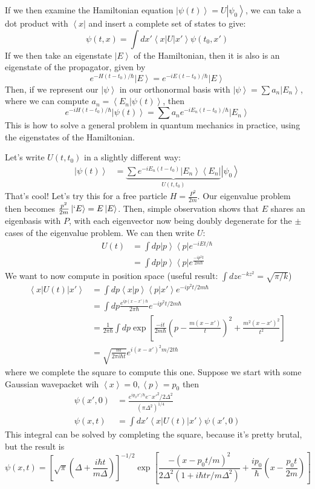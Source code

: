 \documentclass[10pt]{report}
\newcommand{\bra}[1]{\left<#1\right|}
\newcommand{\ket}[1]{\left|#1\right>}
\newcommand{\dotp}[2]{\left<#1\left.\right|#2\right>}
\newcommand{\expvalue}[1]{\left<#1\right>}
\begin{document}
If we then examine the Hamiltonian equation $\ket{\psi(t)} = U\ket{\psi_0}$, we can take a dot product with $\bra{x}$ and insert a complete set of states to give:
$$\psi(t,x) = \int dx' \bra{x}U\ket{x'}\psi(t_0,x')$$
If we then take an eigenstate $\ket{E}$ of the Hamiltonian, then it is also is an eigenstate of the propagator, given by
$$e^{-H(t-t_0)/\hbar}\ket{E} = e^{-iE(t-t_0)/\hbar}\ket{E}$$
Then, if we represent our $\ket{\psi}$ in our orthonormal basis with $\ket{\psi} = \sum a_n \ket{E_n}$, where we can compute $a_n = \dotp{E_n}{\psi(t)}$, then
$$e^{-iH(t-t_0)/\hbar}\ket{\psi(t)} = \sum a_n e^{-iE_n(t-t_0)/\hbar}\ket{E_n}$$
This is how to solve a general problem in quantum mechanics in practice, using the eigenstates of the Hamiltonian.

Let's write $U(t,t_0)$ in a slightly different way:
\begin{align}
	\ket{\psi(t)} &= \underbrace{\sum e^{-iE_n(t-t_0)}\ket{E_n}\bra{E_n}}_{U(t,t_0)}\ket{\psi_0}
\end{align}
That's cool! Let's try this for a free particle $H = \frac{P^2}{2m}$. Our eigenvalue problem then becomes $\frac{p^2}{2m}\ket{`E}=E\ket{E}$. Then, simple observation shows that $E$ shares an eigenbasis with $P$, with each eigenvector now being doubly degenerate for the $\pm$ cases of the eigenvalue problem. We can then write $U$:
\begin{align}
	U(t) &= \int dp \ket{p}\bra{p}e^{-iEt/\hbar}\\
	&= \int dp \ket{p}\bra{p}e^{\frac{-ip^2t}{2m\hbar}}
\end{align}
We want to now compute in position space (useful result: $\int dz e^{-kz^2} = \sqrt{\pi/k}$)
\begin{align}
	\bra{x}U(t)\ket{x'} &= \int dp \dotp{x}{p}\dotp{p}{x'}e^{-ip^2t/2m\hbar}\\
	&= \int dp \frac{e^{ip(x-x')\hbar}}{2\pi\hbar}e^{-ip^2t/2m\hbar}\\
	&= \frac{1}{2\pi\hbar}\int dp \exp \left[\frac{-it}{2m\hbar} \left( p-\frac{m(x-x')}{t} \right)^2 + \frac{m^2(x-x')^2}{t^2}\right]\\
	&= \sqrt{\frac{m}{2\pi i \hbar t}} e^{i\left( x-x' \right)^2m/2t\hbar}
\end{align}
where we complete the square to compute this one. Suppose we start with some Gaussian wavepacket wih $\expvalue{x} = 0, \expvalue{p} = p_0$ then
\begin{align}
	\psi(x',0) &= \frac{e^{ip_0x'/\hbar}e^-x'^2/2\Delta^2}{\left( \pi\Delta^2 \right)^{1/4}}\\
	\psi(x,t) &= \int dx' \bra{x}U(t)\ket{x'}\psi(x',0)
\end{align}
This integral can be solved by completing the square, because it's pretty brutal, but the result is
$$\psi(x,t) = \left[ \sqrt{\pi} \left( \Delta + \frac{i\hbar t}{m\Delta} \right) \right]^{-1/2} \exp \left[ \frac{-\left( x-p_0t/m \right)^2}{2\Delta^2\left( 1+i\hbar tr/m\Delta^2 \right)} + \frac{ip_0}{\hbar}\left( x-\frac{p_0t}{2m} \right) \right]$$
\end{document}
